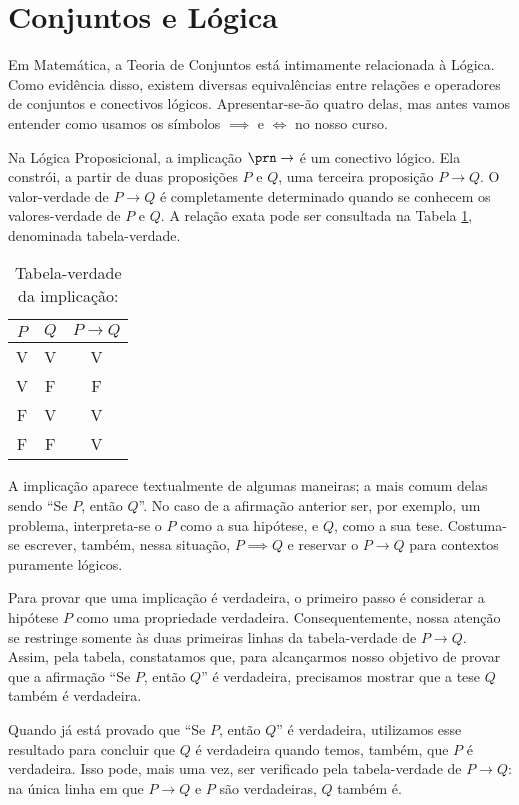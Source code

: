 \section{Conjuntos e Lógica}



Em Matemática, a Teoria de Conjuntos está intimamente relacionada à Lógica.
Como evidência disso, existem diversas equivalências entre relações e operadores de conjuntos e conectivos lógicos.
Apresentar-se-ão quatro delas, mas antes vamos entender como usamos os símbolos $ \implies$ e $\iff$ no nosso curso.

Na Lógica Proposicional, a implicação $\prn \to $ é um conectivo lógico. 
Ela constrói, a partir de duas proposições $P$ e $Q$, uma terceira proposição $P \to Q$.
O valor-verdade de $P \to Q$ é completamente determinado quando se conhecem os valores-verdade de $P$ e $Q$.
A relação exata pode ser consultada na Tabela \ref{tbl:implicacao}, denominada tabela-verdade.

\begin{table}[h]
\caption{Tabela-verdade da implicação:}
\label{tbl:implicacao}
\centering
\begin{tabular}{cc|c}
$P$		& $Q$		& $P \to Q$	\\ \hline
V		& V			& V			\\
V		& F			& F			\\
F		& V			& V			\\
F		& F			& V			\\	
\end{tabular}
\end{table}

A implicação aparece textualmente de algumas maneiras; a mais comum delas sendo ``Se $P$, então $Q$''.
No caso de a afirmação anterior ser, por exemplo, um problema, interpreta-se o $P$ como a sua hipótese, e $Q$, como a sua tese.
Costuma-se escrever, também, nessa situação, $P \implies Q$ e reservar o $P \to Q$ para contextos puramente lógicos.

Para provar que uma implicação é verdadeira, o primeiro passo é considerar a hipótese $P$ como uma propriedade verdadeira.
Consequentemente, nossa atenção se restringe somente às duas primeiras linhas da tabela-verdade de $P \to Q$.
Assim, pela tabela, constatamos que, para alcançarmos nosso objetivo de provar que a afirmação ``Se $P$, então $Q$'' é verdadeira,
precisamos mostrar que a tese $Q$ também é verdadeira.

Quando já está provado que ``Se $P$, então $Q$'' é verdadeira, 
utilizamos esse resultado para concluir que $Q$ é verdadeira quando temos, também, que $P$ é verdadeira.
Isso pode, mais uma vez, ser verificado pela tabela-verdade de $P \to Q$:
na única linha em que $P \to Q$ e $P$ são verdadeiras, $Q$ também é.

